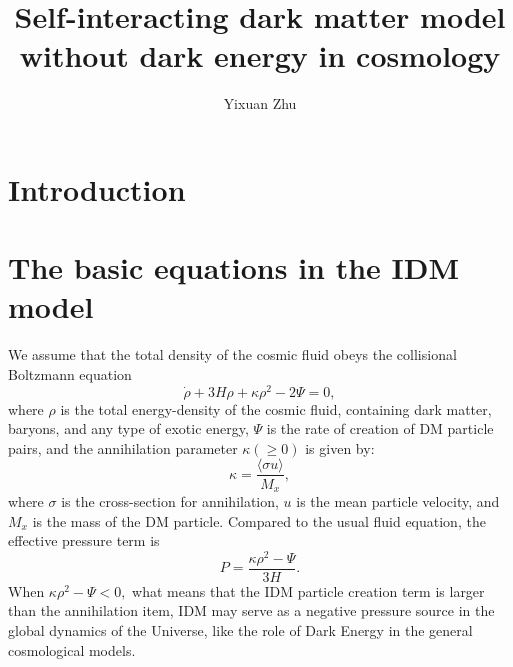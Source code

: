 \documentclass{aa}
\begin{document}
 

   \title{Self-interacting dark matter model without dark energy in cosmology}

   \author{Yixuan Zhu}


   \date{}
 
   \abstract{}
   
   \keywords{}

   \maketitle

\section{Introduction}

\section{The basic equations in the IDM model}

   We assume that the total density of the cosmic fluid obeys
   the collisional Boltzmann equation
   \begin{equation}
      \dot{\rho}+3H\rho+\kappa\rho^2-2\Psi=0,
   \end{equation}
   where $\rho$ is the total energy-density of the cosmic fluid,
   containing dark matter, baryons, and any type of exotic energy,
   $\Psi$ is the rate of creation of DM particle pairs, and the
   annihilation parameter $\kappa(\geq0)$ is given by:
   \begin{equation}
      \kappa=\frac{\langle\sigma u\rangle}{M_x},\label{eq:2}
   \end{equation}
   where $\sigma$ is the cross-section for annihilation, $u$ is
   the mean particle velocity, and $M_x$ is the mass of the DM
   particle.
   Compared to the usual fluid equation, the effective pressure term
   is \begin{equation}
      P=\frac{\kappa\rho^2-\Psi}{3H}.
   \end{equation}
   When $\kappa\rho^2-\Psi<0,$ what means that the IDM particle
   creation term is larger than the annihilation item, IDM may serve
   as a negative pressure source in the global dynamics of the Universe,
   like the role of Dark Energy in the general cosmological models.
\end{document}
